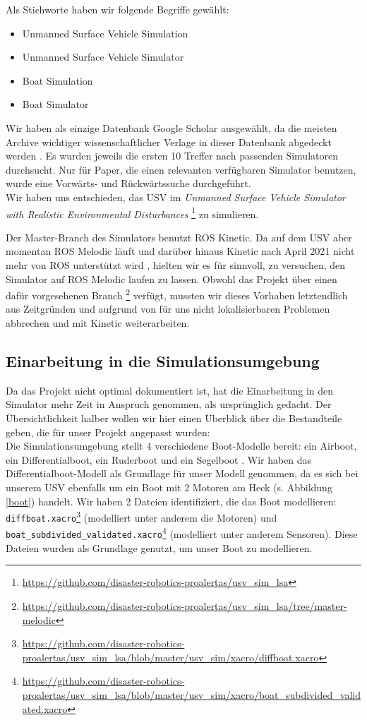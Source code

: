 \documentclass[11pt]{article}
\begin{document}
Als Stichworte haben wir folgende Begriffe gewählt:

\begin{itemize}
	\item Unmanned Surface Vehicle Simulation
	\item Unmanned Surface Vehicle Simulator
	\item Boat Simulation
	\item Boat Simulator
\end{itemize}

Wir haben als einzige Datenbank Google Scholar ausgewählt, da die meisten Archive wichtiger wissenschaftlicher Verlage in dieser Datenbank abgedeckt werden \cite{googlescholar}. Es wurden jeweils die ersten 10 Treffer nach passenden Simulatoren durchsucht. Nur für Paper, die einen relevanten verfügbaren Simulator benutzen, wurde eine Vorwärts- und Rückwärtssuche durchgeführt.\\

Wir haben uns entschieden, das USV im \textit{Unmanned Surface Vehicle Simulator with Realistic Environmental Disturbances} \footnote{\url{https://github.com/disaster-robotics-proalertas/usv_sim_lsa}} zu simulieren.

Der Master-Branch des Simulators benutzt ROS Kinetic. Da auf dem USV aber momentan ROS Melodic läuft und darüber hinaus Kinetic nach April 2021 nicht mehr von ROS unterstützt wird \cite{rosdistros}, hielten wir es für sinnvoll, zu versuchen, den Simulator auf ROS Melodic laufen zu lassen. Obwohl das Projekt über einen dafür vorgesehenen Branch \footnote{\url{https://github.com/disaster-robotics-proalertas/usv_sim_lsa/tree/master-melodic}} verfügt, mussten wir dieses Vorhaben letztendlich aus Zeitgründen und aufgrund von für uns nicht lokalisierbaren Problemen abbrechen und mit Kinetic weiterarbeiten.

\subsection{Einarbeitung in die Simulationsumgebung}

Da das Projekt nicht optimal dokumentiert ist, hat die Einarbeitung in den Simulator mehr Zeit in Anspruch genommen, als ursprünglich gedacht. Der Übersichtlichkeit halber wollen wir hier einen Überblick über die Bestandteile geben, die für unser Projekt angepasst wurden:\\
Die Simulationsumgebung stellt 4 verschiedene Boot-Modelle bereit: ein Airboot, ein Differentialboot, ein Ruderboot und ein Segelboot \cite{paravisi2019}. Wir haben das Differentialboot-Modell als Grundlage für unser Modell genommen, da es sich bei unserem USV ebenfalls um ein Boot mit 2 Motoren am Heck (s. Abbildung \ref{boot}) handelt. Wir haben 2 Dateien identifiziert, die das Boot modellieren: \texttt{diffboat.xacro}\footnote{\url{https://github.com/disaster-robotics-proalertas/usv_sim_lsa/blob/master/usv_sim/xacro/diffboat.xacro}} (modelliert unter anderem die Motoren) und \texttt{boat\_subdivided\_validated.xacro}\footnote{\url{https://github.com/disaster-robotics-proalertas/usv_sim_lsa/blob/master/usv_sim/xacro/boat_subdivided_validated.xacro}} (modelliert unter anderem Sensoren). Diese Dateien wurden als Grundlage genutzt, um unser Boot zu modellieren.
\end{document}

